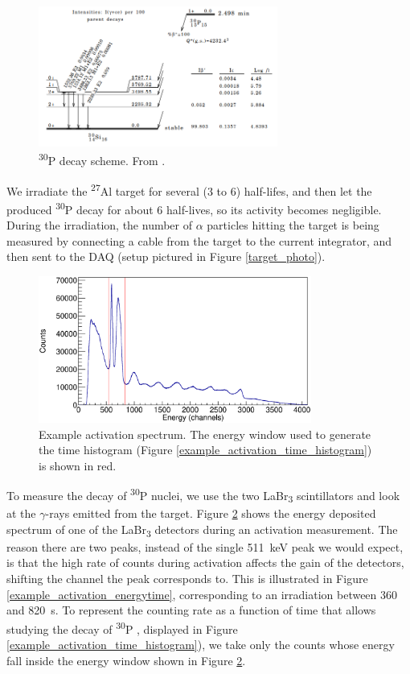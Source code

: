 \documentclass[a4paper,12pt]{report}
\newcommand{\Aliso}{\textsuperscript{27}Al }
\newcommand{\Piso}{\textsuperscript{30}P }
\begin{document}
\begin{figure}[H]
	\centering
	\includegraphics[width=0.7\textwidth]{Piso_decay_scheme.png}
	\caption{\Piso decay scheme.
	From \cite{nucleardatasheets}.}
	\label{Piso_decay_scheme}
\end{figure}

We irradiate the \Aliso target for several (3 to 6) half-lifes, and then let the produced \Piso decay for about 6 half-lives, so its activity becomes negligible.
During the irradiation, the number of $\alpha$ particles hitting the target is being measured by connecting a cable from the target to the current integrator, and then sent to the DAQ (setup pictured in Figure \ref{target_photo}).

\begin{figure}[H]
	\centering
	\includegraphics[width=0.80\textwidth]{example_activation_energy_histogram.eps}
	\caption{Example activation spectrum.
	The energy window used to generate the time histogram (Figure \ref{example_activation_time_histogram}) is shown in red.}	%
	\label{example_activation_energy_histogram}
\end{figure}

To measure the decay of \Piso nuclei, we use the two LaBr\textsubscript{3} scintillators and look at the $\gamma$-rays emitted from the target.
Figure \ref{example_activation_energy_histogram} shows the energy deposited spectrum of one of the LaBr\textsubscript{3} detectors during an activation measurement.
The reason there are two peaks, instead of the single \qty{511}{\keV} peak we would expect, is that the high rate of counts during activation affects the gain of the detectors, shifting the channel the peak corresponds to.
This is illustrated in Figure \ref{example_activation_energytime}, corresponding to an irradiation between 360 and \qty{820}{\s}.
To represent the counting rate as a function of time that allows studying the decay of \Piso, displayed in Figure \ref{example_activation_time_histogram}), we take only the counts whose energy fall inside the energy window shown in Figure \ref{example_activation_energy_histogram}.
\end{document}
